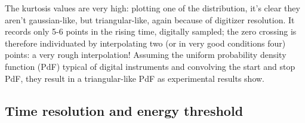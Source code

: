 \documentclass[11pt,a4 paper]{article}
\begin{document}
The kurtosis values are very high: plotting one of the distribution, it's clear they aren't gaussian-like, but triangular-like, again because of digitizer resolution. It records only 5-6 points in the rising time, digitally sampled; the zero crossing is therefore individuated by interpolating two (or in very good conditions four) points: a very rough interpolation! Assuming the uniform probability density function (PdF) typical of digital instruments and convolving the start and stop PdF, they result in a triangular-like PdF as experimental results show.

\subsection{Time resolution and energy threshold}
\end{document}
